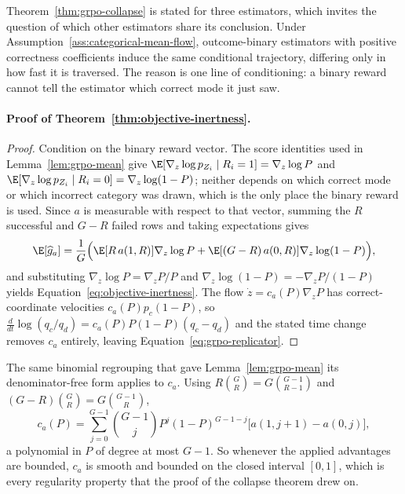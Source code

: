 Theorem~\ref{thm:grpo-collapse} is stated for three estimators, which invites
the question of which other estimators share its conclusion. Under
Assumption~\ref{ass:categorical-mean-flow}, outcome-binary estimators with
positive correctness coefficients induce the same conditional trajectory,
differing only in how fast it is traversed. The
reason is one line of conditioning: a binary reward cannot tell the estimator
which correct mode it just saw.

\paragraph{Proof of Theorem~\ref{thm:objective-inertness}.}

\begin{proof}
\enforcehalffinalproseline
Condition on the binary reward vector. The score identities used in
Lemma~\ref{lem:grpo-mean} give
$\E[\nabla_z\log p_{Z_i}\mid R_i=1]=\nabla_z\log P$ and
$\E[\nabla_z\log p_{Z_i}\mid R_i=0]=\nabla_z\log(1-P)$; neither depends on
which correct mode or which incorrect category was drawn, which is the only
place the binary reward is used. Since $a$ is measurable with respect to that
vector, summing the $R$ successful and $G-R$ failed rows and taking
expectations gives
\[
  \E[\widehat g_a]
  =\frac1G\Big(\E[R\,a(1,R)]\nabla_z\log P
   +\E[(G-R)\,a(0,R)]\nabla_z\log(1-P)\Big),
\]
and substituting $\nabla_z\log P=\nabla_zP/P$ and
$\nabla_z\log(1-P)=-\nabla_zP/(1-P)$ yields
Equation~\eqref{eq:objective-inertness}. The flow
$\dot z=c_a(P)\nabla_zP$ has correct-coordinate velocities
$c_a(P)p_c(1-P)$, so $\frac{d}{dt}\log(q_c/q_d)=c_a(P)P(1-P)(q_c-q_d)$ and the
stated time change removes $c_a$ entirely, leaving
Equation~\eqref{eq:grpo-replicator}.
\end{proof}


The same binomial regrouping that gave Lemma~\ref{lem:grpo-mean} its
denominator-free form applies to $c_a$. Using $R\binom GR=G\binom{G-1}{R-1}$
and $(G-R)\binom GR=G\binom{G-1}{R}$,
\begin{equation}
 c_a(P)=\sum_{j=0}^{G-1}\binom{G-1}{j}P^j(1-P)^{G-1-j}
 \big[a(1,j+1)-a(0,j)\big],
 \label{eq:inertness-polynomial}
\end{equation}
a polynomial in $P$ of degree at most $G-1$. So whenever the applied advantages
are bounded, $c_a$ is smooth and bounded on the closed interval $[0,1]$, which
is every regularity property that the proof of the collapse theorem drew on.

